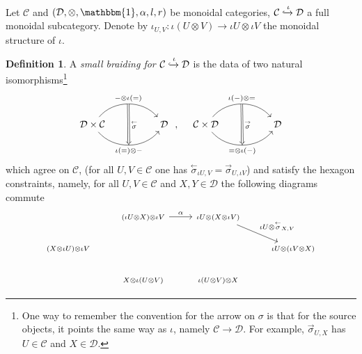 \documentclass[12pt,dvipsnames]{article}
\numberwithin{equation}{section}
\theoremstyle{definition}
\newtheorem{definition}{Definition}[section]
\newcommand{\cat}[1]{\mathcal{#1}}
\newcommand{\1}{\ensuremath{\mathbbm{1}}}
\newcommand{\lc}{\ensuremath{\overset{\rightarrow}{\sigma}}}
\newcommand{\rc}{\ensuremath{\overset{\leftarrow}{\sigma}}}
\newcommand{\blank}{{-}}
\newcommand{\bblank}{{=}}
\begin{document}
Let $\cat{C}$ and $(\cat{D},\otimes,\1,\alpha,l,r)$ be monoidal categories, 
$\cat{C}\xhookrightarrow{\iota}\cat{D}$ a full monoidal subcategory. Denote by $\iota_{U,V}:\iota(U\otimes V) \to \iota U\otimes \iota V$ the monoidal structure of $\iota$.
\begin{definition}\label{def:SmallBraiding}
    A \emph{small braiding for $\cat{C}\xhookrightarrow{\iota}\cat{D}$} is the data of two natural isomorphisms\footnote{
One way to remember the convention for the arrow on $\sigma$ is that for the source objects, it points the same way as $\iota$, namely $\cat{C}\to\cat{D}$. For example, $\lc_{U,X}$ has $U \in \cat{C}$ and $X \in \cat{D}$.
    }
    \begin{equation}
        \begin{tikzcd}
        	{\cat{D}\times\cat{C}} && \cat{D}
        	\arrow["\blank\otimes\iota(\bblank)"{name=U, anchor=center, above}, bend left=50, from=1-1, to=1-3]
            \arrow["\iota(\bblank)\otimes\blank"{name=D, anchor=center, below}, bend right=50, from=1-1, to=1-3]
        	\arrow["\rc", Rightarrow, from=U, to=D]
        \end{tikzcd} \;,\quad 
        \begin{tikzcd}
        	{\cat{C}\times\cat{D}} && \cat{D}
        	\arrow["\iota(\blank)\otimes \bblank"{name=U, anchor=center, above}, bend left=50, from=1-1, to=1-3]
            \arrow["\bblank\otimes\iota(\blank)"{name=D, anchor=center, below}, bend right=50, from=1-1, to=1-3]
        	\arrow["\lc", Rightarrow, from=U, to=D]
        \end{tikzcd}
    \end{equation}
    which agree on $\cat{C}$, (for all $U,V\in\cat{C}$ one has $\rc_{\iota U,V} = \lc_{U,\iota V}$) and satisfy the hexagon constraints, namely, for all $U,V\in\cat{C}$ and $X,Y\in\cat{D}$ the following diagrams commute 
    \begin{subequations}
    \begin{equation}\label{eq:SmallHexA}
        \begin{tikzcd}
        	& {\scriptstyle (\iota U\otimes X)\otimes \iota V} & {\scriptstyle \iota U\otimes(X\otimes \iota V)} \\
        	{\scriptstyle (X\otimes \iota U)\otimes \iota V} &&& {\scriptstyle \iota U\otimes(\iota V\otimes X)} \\
        	& {\scriptstyle X\otimes \iota(U\otimes V)} & {\scriptstyle \iota(U\otimes V)\otimes X}
        	\arrow["{\alpha}", from=1-2, to=1-3]
        	\arrow["{\iota U\otimes\rc_{X,V}}", from=1-3, to=2-4]

\end{tikzcd}
\end{equation}
\end{subequations}
\end{definition}
\end{document}
